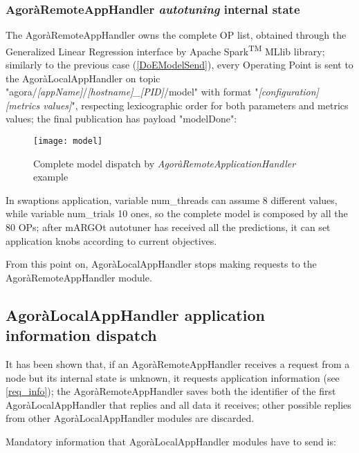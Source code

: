 \subsubsection{AgoràRemoteAppHandler \textit{autotuning} internal state}\label{modelSend}

The AgoràRemoteAppHandler owns the complete OP list, obtained through the Generalized Linear Regression interface by Apache Spark\textsuperscript{TM} MLlib library; similarly to the previous case (\ref{DoEModelSend}), every Operating Point is sent to the AgoràLocalAppHandler on topic "agora\slash{}\textit{[app\-Name]}\slash{}\textit{[host\-name]\_[PID]}\slash{}model" with format "\textit{[configuration] [metrics values]}", respecting lexicographic order for both parameters and metrics values; the final publication has payload "modelDone":

\begin{figure}[H]

    \centering
    \texttt{[image: model]}
    \caption{Complete model dispatch by \textit{AgoràRemoteApplicationHandler} example}
    \label{fig:model}
    
\end{figure}

In swaptions application, variable num\_threads can assume 8 different values, while variable num\_trials 10 ones, so the complete model is composed by all the 80 OPs; after mARGOt autotuner has received all the predictions, it can set application knobs according to current objectives.

From this point on, AgoràLocalAppHandler stops making requests to the AgoràRemoteAppHandler module.





\subsection{AgoràLocalAppHandler application information dispatch}\label{client_info}

It has been shown that, if an AgoràRemoteAppHandler receives a request from a node but its internal state is unknown, it requests application information (see \ref{req_info}); the AgoràRemoteAppHandler saves both the identifier of the first AgoràLocalAppHandler that replies and all data it receives; other possible replies from other AgoràLocalAppHandler modules are discarded.

Mandatory information that AgoràLocalAppHandler modules have to send is:

